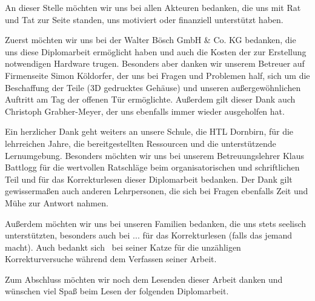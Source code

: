 An dieser Stelle möchten wir uns bei allen Akteuren bedanken, die uns mit Rat und Tat zur Seite standen, uns motiviert oder finanziell unterstützt haben.

Zuerst möchten wir uns bei der Walter Bösch GmbH \& Co. KG bedanken, die uns diese Diplomarbeit ermöglicht haben und auch die Kosten der zur Erstellung notwendigen Hardware trugen. Besonders aber danken wir unserem Betreuer auf Firmenseite Simon Köldorfer, der uns bei Fragen und Problemen half, sich um die Beschaffung der Teile (\zB 3D gedrucktes Gehäuse) und unseren außergewöhnlichen Auftritt am Tag der offenen Tür ermöglichte. Außerdem gilt dieser Dank auch Christoph Grabher-Meyer, der uns ebenfalls immer wieder ausgeholfen hat.

Ein herzlicher Dank geht weiters an unsere Schule, die HTL Dornbirn, für die lehrreichen Jahre, die bereitgestellten Ressourcen und die unterstützende Lernumgebung. Besonders möchten wir uns bei unserem Betreuungslehrer Klaus Battlogg für die wertvollen Ratschläge beim organisatorischen und schriftlichen Teil und für das Korrekturlesen dieser Diplomarbeit bedanken. Der Dank gilt gewissermaßen auch anderen Lehrpersonen, die sich bei Fragen ebenfalls Zeit und Mühe zur Antwort nahmen.

Außerdem möchten wir uns bei unseren Familien bedanken, die uns stets seelisch unterstützten, besonders auch bei ... für das Korrekturlesen (falls das jemand macht).
Auch bedankt sich \pezze\ bei seiner Katze für die unzähligen Korrekturversuche während dem Verfassen seiner Arbeit.

Zum Abschluss möchten wir noch dem Lesenden dieser Arbeit danken und wünschen viel Spaß beim Lesen der folgenden Diplomarbeit.